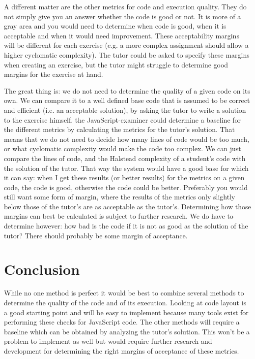 A different matter are the other metrics for code and execution quality. They
do not simply give you an answer whether the code is good or not. It is more of
a gray area and you would need to determine when code is good, when it is
acceptable and when it would need improvement. These acceptability margins will
be different for each exercise (e.g. a more complex assignment should allow a
higher cyclomatic complexity). The tutor could be asked to specify these
margins when creating an exercise, but the tutor might struggle to determine
good margins for the exercise at hand.

The great thing is: we do not need to determine the quality of a given code
on its own. We can compare it to a well defined base code that is assumed to be
correct and efficient (i.e. an acceptable solution),
by asking the tutor to write a solution to the exercise himself.
the JavaScript-examiner could determine a baseline for the different metrics
by calculating the metrics for the tutor's solution.
That means that we do not
need to decide how many lines of code would be too much, or what cyclomatic
complexity would make the code too complex. We can just compare the lines of
code, and the Halstead complexity of a student's code with the solution of the
tutor.
That way the system would have a good base for which it can say:
when I get these results (or better results) for the metrics on a given
code, the code is good, otherwise the code could be better. Preferably you
would still want some form of margin, where the results of the metrics only
slightly below those of the tutor's are as acceptable as the
tutor's. Determining how those margins can best be calculated is subject to
further research.
We do have to determine however: how bad is the code if it is not as
good as the solution of the tutor? There should probably be some margin of
acceptance.


\section{Conclusion}

While no one method is perfect it would be best to combine several methods to
determine the quality of the code and of its execution. Looking at code layout
is a good starting point and will be easy to implement because many tools exist
for performing these checks for JavaScript code. The other methods will require
a baseline which can be obtained by analyzing the tutor's solution. This won't
be a problem to implement as well but would require further research and
development for determining the right margins of acceptance of these metrics.

